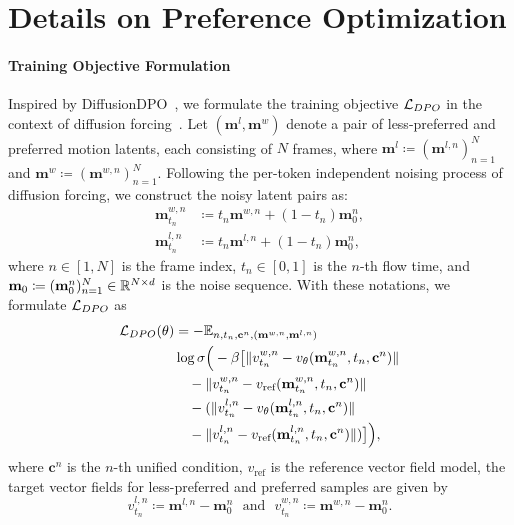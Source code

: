 \section{Details on Preference Optimization}\label{sec:apx_dpo}

\paragraph{Training Objective Formulation}
Inspired by DiffusionDPO~\citep{wallace2024diffusiondpo}, we formulate the training objective $\mathcal{L}_{DPO}$ in the context of diffusion forcing~\citep{diffusion_forcing}. Let $(\mathbf{m}^l, \mathbf{m}^w)$ denote a pair of less-preferred and preferred motion latents, each consisting of $N$ frames, where $\mathbf{m}^l \coloneq (\mathbf{m}^{l, n})_{n=1}^{N}$ and $\mathbf{m}^w \coloneq (\mathbf{m}^{w, n})_{n=1}^{N}$. Following the per-token independent noising process of diffusion forcing, we construct the noisy latent pairs as:
\begin{equation}
\begin{aligned}
    \mathbf{m}_{t_n}^{w, n} &\coloneq t_n \mathbf{m}^{w, n} + (1 - t_n)\mathbf{m}_0^{n}, \\
    \mathbf{m}_{t_n}^{l, n} &\coloneq t_n \mathbf{m}^{l, n} + (1 - t_n)\mathbf{m}_0^{n},
\end{aligned}
\end{equation}
where $n \in [1, N]$ is the frame index, $t_n \in [0, 1]$ is the $n$-th flow time, and $\mathbf{m}_0 \coloneq (\mathbf{m}_0^{n})_{n=1}^{N} \in \mathbb{R}^{N \times d}$ is the noise sequence. With these notations, we formulate $\mathcal{L}_{DPO}$ as
\begin{equation}
\begin{aligned}
\mathcal{L}_{DPO}(\theta)
&= -\mathbb{E}_{n, t_n, \mathbf{c}^n, (\mathbf{m}^{w, n},\mathbf{m}^{l, n})} \\
& \log \sigma\Big(
    - \beta \big[ \|v^{w, n}_{t_n} - v_{\theta}(\mathbf{m}^{w, n}_{t_n}, t_n, \mathbf{c}^n)\| \\
 & \quad - \|v^{w, n}_{t_n} - v_{\text{ref}}(\mathbf{m}^{w, n}_{t_n}, t_n, \mathbf{c}^n)\|  \\
 & \quad - (\|v^{l, n}_{t_n} - v_{\theta}(\mathbf{m}^{l, n}_{t_n}, t_n, \mathbf{c}^n)\| \\
 & \quad - \|v^{l, n}_{t_n} - v_{\text{ref}}(\mathbf{m}^{l,n}_{t_n}, t_n, \mathbf{c}^n)\|)\big] \Big), \\
\end{aligned}
\label{eq:dpo_train}
\end{equation}
where $\mathbf{c}^n$ is the $n$-th unified condition, $v_{\text{ref}}$ is the reference vector field model, the target vector fields for less-preferred and preferred samples are given by
\begin{equation}
v_{t_n}^{l, n} \coloneq \mathbf{m}^{l, n} - \mathbf{m}_0^{n} ~~~\text{and}~~~ v_{t_n}^{w, n} \coloneq \mathbf{m}^{w, n} - \mathbf{m}_0^{n}.
\end{equation}


